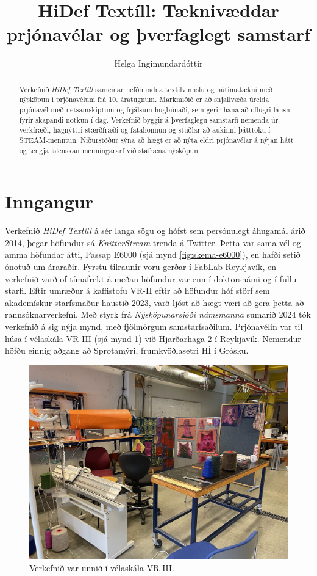 \documentclass[a4paper,12pt]{article}
\title{HiDef Textíll: Tæknivæddar prjónavélar og þverfaglegt samstarf}
\author{Helga Ingimundardóttir}
\date{}
\begin{document}
\maketitle

\begin{abstract}
Verkefnið \emph{HiDef Textíll} sameinar hefðbundna textílvinnslu og nútímatækni með
nýsköpun í prjónavélum frá 10. áratugnum. Markmiðið er að snjallvæða úrelda prjónavél
með netsamskiptum og frjálsum hugbúnaði, sem gerir hana að öflugri lausn fyrir
skapandi notkun í dag. Verkefnið byggir á þverfaglegu samstarfi nemenda úr verkfræði,
hagnýttri stærðfræði og fatahönnun og stuðlar að aukinni þátttöku í STEAM-menntun.
Niðurstöður sýna að hægt er að nýta eldri prjónavélar á nýjan hátt og tengja íslenskan
menningararf við stafræna nýsköpun.
\end{abstract}

\section{Inngangur}
Verkefnið \emph{HiDef Textíll} á sér langa sögu og hófst sem persónulegt áhugamál árið
2014, þegar höfundur sá \emph{KnitterStream} \cite{knitterstream} trenda á Twitter.
Þetta var sama vél og amma höfundar átti, Passap E6000 (sjá mynd \ref{fig:skema-e6000}), en hafði setið ónotuð um
áraraðir. Fyrstu tilraunir voru gerðar í FabLab Reykjavík, en verkefnið varð of tímafrekt
á meðan höfundur var enn í doktorsnámi og í fullu starfi. Eftir umræður á kaffistofu VR-II 
eftir að höfundur hóf störf sem akademískur starfsmaður haustið 2023, varð ljóst að hægt 
væri að gera þetta að rannsóknarverkefni. Með styrk frá \emph{Nýsköpunarsjóði námsmanna}
sumarið 2024 tók verkefnið á sig nýja mynd, með fjölmörgum samstarfsaðilum. 
Prjónavélin var til húsa í vélaskála VR-III (sjá mynd \ref{fig:workshop}) við Hjarðarhaga 2 í Reykjavík. Nemendur höfðu einnig aðgang að Sprotamýri, frumkvöðlasetri HÍ í Grósku.

\begin{figure}
    \centering
    \includegraphics[width=0.8\linewidth]{figs/workshop.jpg}
    \caption{Verkefnið var unnið í vélaskála VR-III.}
    \label{fig:workshop}
\end{figure}
\end{document}
